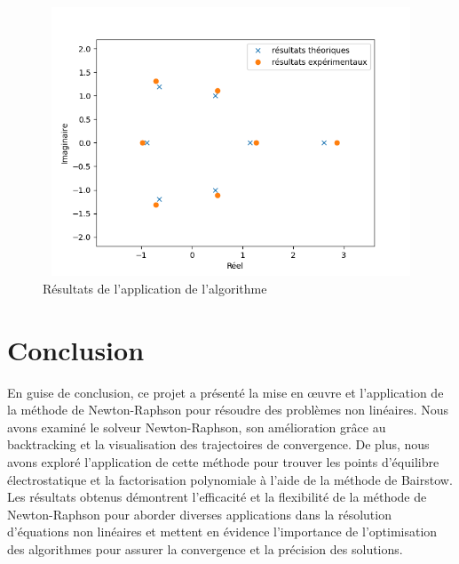 \documentclass{article}
\begin{document}
\newpage
\begin{figure}[ht]
    \centering
    \includegraphics[width = 12cm, height = 8cm]{compare_results.png}
    \caption{Résultats de l'application de l'algorithme}
    \label{compae_results}
\end{figure}


\section{Conclusion}
 En guise de conclusion, ce projet a présenté la mise en œuvre et l'application de la méthode de Newton-Raphson pour résoudre des problèmes non linéaires. Nous avons examiné le solveur Newton-Raphson, son amélioration grâce au backtracking et la visualisation des trajectoires de convergence. De plus, nous avons exploré l'application de cette méthode pour trouver les points d'équilibre électrostatique et la factorisation polynomiale à l'aide de la méthode de Bairstow. Les résultats obtenus démontrent l'efficacité et la flexibilité de la méthode de Newton-Raphson pour aborder diverses applications dans la résolution d'équations non linéaires et mettent en évidence l'importance de l'optimisation des algorithmes pour assurer la convergence et la précision des solutions.
\end{document}
